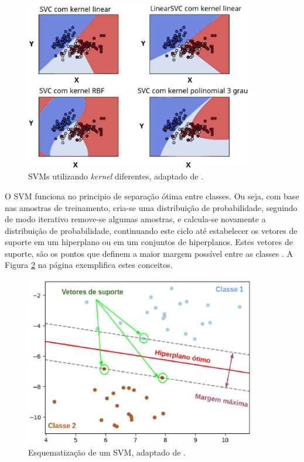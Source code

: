 \begin{figure}[!htb]
    \centering
     \includegraphics[width=0.9\textwidth]{figuras/svmkernel.eps}
     \caption{SVMs utilizando \textit{kernel} diferentes, adaptado de .}
     \label{svmkernel}
 \end{figure}

 O SVM funciona no principio de separação ótima entre classes. Ou seja, com base nas amostras de treinamento, cria-se uma distribuição de probabilidade, seguindo de modo iterativo remove-se algumas amostras, e calcula-se novamente a distribuição de probabilidade, continuando este ciclo até estabelecer os vetores de suporte em um hiperplano ou em um conjuntos de hiperplanos. Estes vetores de suporte, são os pontos que definem a maior margem possível entre as classes \cite{huang2002assessment}. A Figura \ref{svm_hiperplano} na página \pageref{svm_hiperplano} exemplifica estes conceitos.

 \begin{figure}[!htb]
     \centering
     \includegraphics[width=0.9\textwidth]{figuras/svm_hiperplano.eps}
     \caption{Esquematização de um SVM, adaptado de .}
     \label{svm_hiperplano}
 \end{figure}

